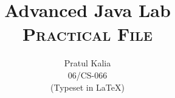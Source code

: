 \documentclass{report}
\title{{\Huge Advanced Java Lab}\\
\textsc{Practical File}}
\author{Pratul Kalia\\
06/CS-066\\
{\small (Typeset in \LaTeX{})}}
\date{}
\begin{document}
\maketitle
\renewcommand{\thesection}{\arabic{section}.}
\renewcommand{\thesubsection}{\arabic{section}.\arabic{subsection}}







\end{document}
